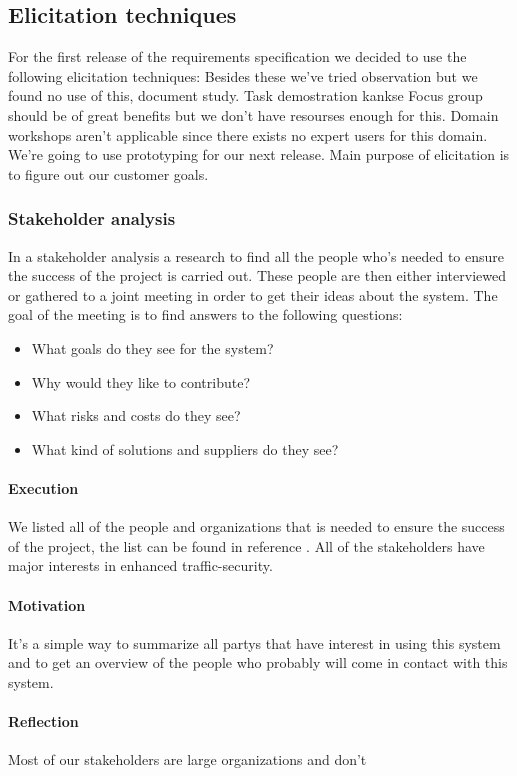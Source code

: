 \documentclass[10pt]{article}
\begin{document}
\subsection{Elicitation techniques}
For the first release of the requirements specification we decided to use the following elicitation techniques:
Besides these we’ve tried observation but we found no use of this, document study.
Task demostration kankse
Focus group should be of great benefits but we don’t have resourses enough for this.
Domain workshops aren’t applicable since there exists no expert users for this domain.
We’re going to use prototyping for our next release.
Main purpose of elicitation is to figure out our customer goals.

\subsubsection{Stakeholder analysis}
In a stakeholder analysis a research to find all the people who’s needed to ensure the success of the project is carried out. These people are then either interviewed or gathered to a joint meeting in order to get their ideas about the system. The goal of the meeting is to find answers to the following questions:
\begin{itemize}
\item What goals do they see for the system?
\item Why would they like to contribute?
\item What risks and costs do they see?
\item What kind of solutions and suppliers do they see?
\end{itemize}

\paragraph{Execution}
\hfill \break
We listed all of the people and organizations that is needed to ensure the success of the project, the list can be found in reference \cite{pmv2}. All of the stakeholders have major interests in enhanced traffic-security.
\paragraph{Motivation}
\hfill \break
It’s a simple way to summarize all partys that have interest in using this system and to get an overview of the people who probably will come in contact with this system.
\paragraph{Reflection}
\hfill \break
Most of our stakeholders are large organizations and don’t
\end{document}
